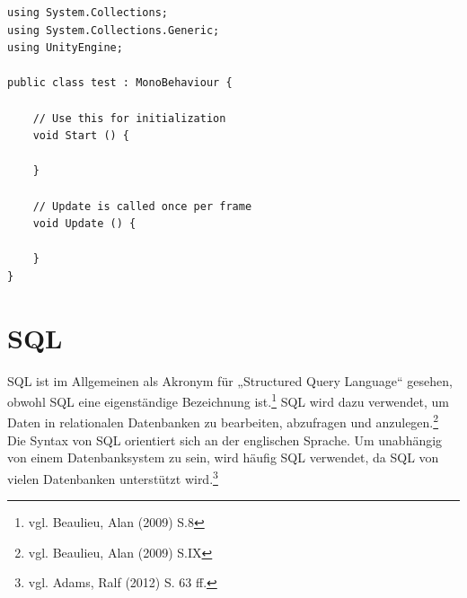\begin{scriptsize}
\lstset{
	float,
	caption=Aufbau eines Unity3D Skriptes, 
	language=[Sharp]C, 	
	frame=single,  
	showstringspaces=false, 
	showspaces=false, 
	numbers=left, 
	captionpos=b, 
	belowcaptionskip=4pt,
	basicstyle=\ttfamily
} 

\begin{lstlisting}[label=lst:unity3Dc]
using System.Collections;
using System.Collections.Generic;
using UnityEngine;

public class test : MonoBehaviour {

	// Use this for initialization
	void Start () {
		
	}
	
	// Update is called once per frame
	void Update () {
		
	}
}
\end{lstlisting}
\end{scriptsize}	

\section{SQL}

SQL ist im Allgemeinen als Akronym für „Structured Query Language“ gesehen, obwohl SQL eine eigenständige Bezeichnung ist.\footnote{vgl. Beaulieu, Alan\cite{sql1} (2009) S.8} SQL wird dazu verwendet, um Daten in relationalen Datenbanken zu bearbeiten, abzufragen und anzulegen.\footnote{vgl. Beaulieu, Alan\cite{sql1} (2009) S.IX} Die Syntax von SQL orientiert sich an der englischen Sprache. Um unabhängig von einem Datenbanksystem zu sein, wird häufig SQL verwendet, da SQL von vielen Datenbanken unterstützt wird.\footnote{vgl. Adams, Ralf\cite{sql2} (2012) S. 63 ff.}